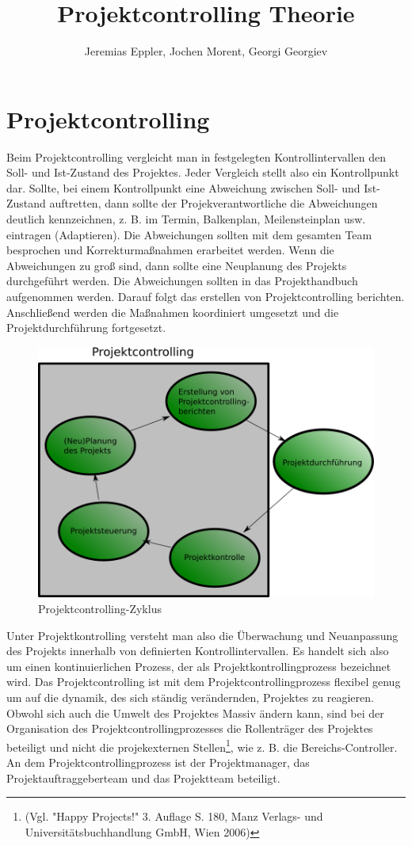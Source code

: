 \documentclass[10pt,a4paper,oneside]{article}
\author{Jeremias Eppler, Jochen Morent, Georgi Georgiev}
\title{Projektcontrolling Theorie}
\begin{document}
\maketitle
\section*{Projektcontrolling}
Beim Projektcontrolling vergleicht man in festgelegten Kontrollintervallen den Soll- und Ist-Zustand des Projektes.
Jeder Vergleich stellt also ein Kontrollpunkt dar. Sollte, bei einem Kontrollpunkt eine Abweichung zwischen Soll- und Ist-Zustand auftretten, dann sollte der Projekverantwortliche die Abweichungen deutlich kennzeichnen, z. B. im Termin, Balkenplan, Meilensteinplan usw. eintragen (Adaptieren). Die Abweichungen sollten mit dem gesamten Team besprochen und Korrekturmaßnahmen erarbeitet werden.
Wenn die Abweichungen zu groß sind, dann sollte eine Neuplanung des Projekts durchgeführt werden.
Die Abweichungen sollten in das Projekthandbuch aufgenommen werden. Darauf folgt das erstellen von Projektcontrolling berichten.
Anschließend werden die Maßnahmen koordiniert umgesetzt und die Projektdurchführung fortgesetzt. 

\begin{figure}[!ht]
\includegraphics[width=\textwidth, height=\textheight, keepaspectratio, angle=0]{image/projekcontrolling-zyklus}
\caption{ Projektcontrolling-Zyklus}
\end{figure}

Unter Projektkontrolling versteht man also die Überwachung und Neuanpassung des Projekts innerhalb von definierten Kontrollintervallen. Es handelt sich also um einen kontinuierlichen Prozess, der als Projektkontrollingprozess bezeichnet wird.
Das Projektcontrolling ist mit dem Projektcontrollingprozess flexibel genug um auf die dynamik, des sich ständig verändernden, Projektes zu reagieren.
Obwohl sich auch die Umwelt des Projektes Massiv ändern kann, sind bei der
Organisation des Projektcontrollingprozesses die Rollenträger des Projektes beteiligt und nicht die projekexternen Stellen\footnote{(Vgl. "Happy Projects!" 3. Auflage S. 180, Manz Verlags- und Universitätsbuchhandlung GmbH, Wien 2006)}, wie z. B. die Bereichs-Controller. An dem Projektcontrollingprozess ist der Projektmanager, das Projektauftraggeberteam und das Projektteam beteiligt.
\end{document}
